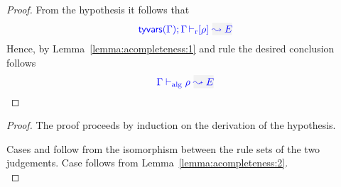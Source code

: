 \begin{proof}
  From the hypothesis it follows that 
\begin{equation*}
\drres{\tyvars{\tenv}}{\tenv}{\rulet}{E}
\end{equation*}
  Hence, by Lemma~\ref{lemma:acompleteness:1} and rule  the desired conclusion follows
\begin{equation*}
\adres{\tenv}{\rulet}{E}
\end{equation*}
\end{proof}

{\centering
{}}

\begin{proof}
The proof proceeds by induction on the derivation of the hypothesis.

Cases  and  follow from the isomorphism
between the rule sets of the two judgements. Case  follows
from Lemma~\ref{lemma:acompleteness:2}.\\

\end{proof}

{\centering
{}}


